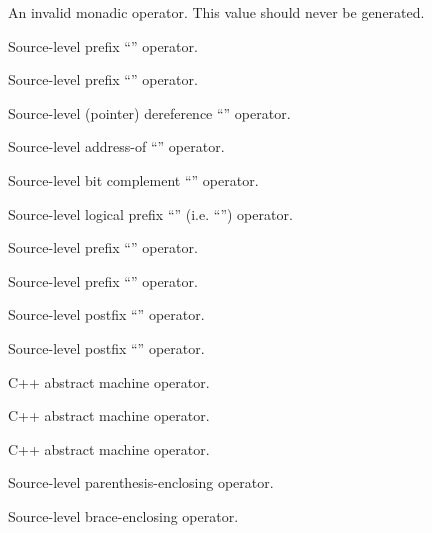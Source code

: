 An invalid monadic operator.  This value should never be generated.

Source-level prefix ``\code{+}'' operator.

Source-level prefix ``\code{-}'' operator. 

Source-level (pointer) dereference ``\code{*}'' operator.

Source-level address-of ``\code{\&}'' operator.

Source-level bit complement ``\code{\~}'' operator.

Source-level logical prefix ``\code{\!}'' (i.e. ``'') operator.

Source-level prefix ``\code{++}'' operator.

Source-level prefix ``\code{--}'' operator.

Source-level postfix ``\code{++}'' operator.

Source-level postfix ``\code{--}'' operator.

 C++ abstract machine operator.

 C++ abstract machine operator.

 C++ abstract machine operator.

 Source-level parenthesis-enclosing operator.

 Source-level brace-enclosing operator.

